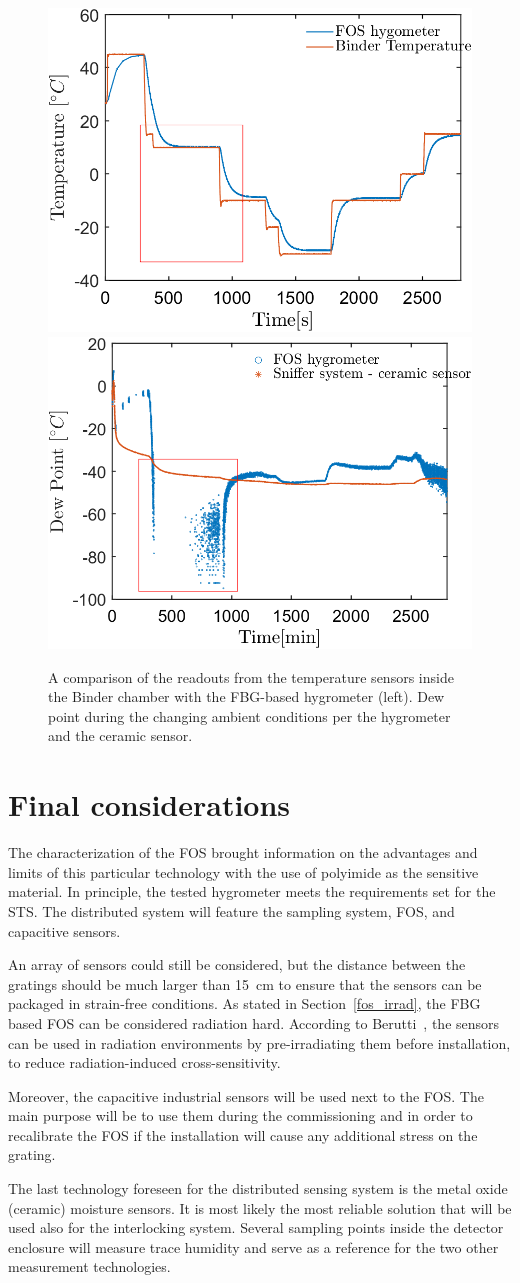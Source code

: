 \begin{figure}[!h]
\centering
\includegraphics[width=0.47\columnwidth]{Chapter5/images/FOS_performance_T.png}
\includegraphics[width=0.49\columnwidth]{Chapter5/images/FOS_performance1.png}
\caption{A comparison of the readouts from the temperature sensors inside the Binder chamber with the \gls{FBG}-based hygrometer (left). Dew point during the changing ambient conditions per the hygrometer and the ceramic sensor.}
\label{Tfig_comparison_2}
\end{figure}
\newpage
\section{Final considerations}

The characterization of the \gls{FOS} brought information on the advantages and limits of this particular technology with the use of polyimide as the sensitive material. In principle, the tested hygrometer meets the requirements set for the \gls{STS}. The distributed system will feature the sampling system, \gls{FOS}, and capacitive sensors.

An array of sensors could still be considered, but the distance between the gratings should be much larger than \SI{15}{\cm} to ensure that the sensors can be packaged in strain-free conditions. As stated in Section~\ref{fos_irrad}, the \gls{FBG} based \gls{FOS} can be considered radiation hard. According to Berutti~\cite{Berruti}, the sensors can be used in radiation environments by pre-irradiating them before installation, to reduce radiation-induced cross-sensitivity. 

Moreover, the capacitive industrial sensors will be used next to the \gls{FOS}. The main purpose will be to use them during the commissioning and in order to recalibrate the \gls{FOS} if the installation will cause any additional stress on the grating.

The last technology foreseen for the distributed sensing system is the metal oxide (ceramic) moisture sensors. It is most likely the most reliable solution that will be used also for the interlocking system. Several sampling points inside the detector enclosure will measure trace humidity and serve as a reference for the two other measurement technologies.